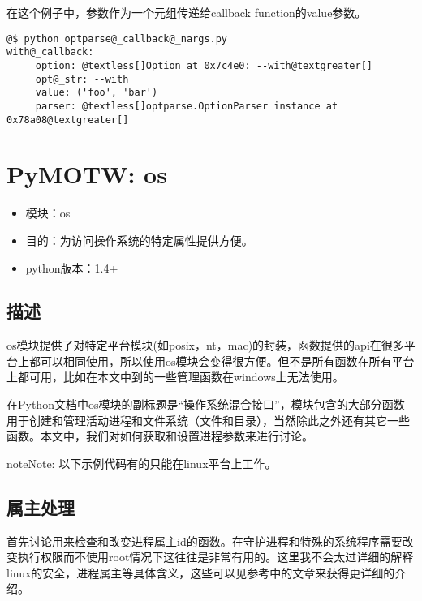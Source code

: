 \documentclass[letterpaper,10pt,english]{manual}
\begin{document}
在这个例子中，参数作为一个元组传递给callback function的value参数。

\begin{Verbatim}[commandchars=@\[\]]
@$ python optparse@_callback@_nargs.py
with@_callback:
     option: @textless[]Option at 0x7c4e0: --with@textgreater[]
     opt@_str: --with
     value: ('foo', 'bar')
     parser: @textless[]optparse.OptionParser instance at 0x78a08@textgreater[]
\end{Verbatim}

\resetcurrentobjects


\section{PyMOTW: os}
\begin{itemize}
\item {} 
模块：os

\item {} 
目的：为访问操作系统的特定属性提供方便。

\item {} 
python版本：1.4+

\end{itemize}


\subsection{描述}

os模块提供了对特定平台模块(如posix，nt，mac)的封装，函数提供的api在很多平台上都可以相同使用，所以使用os模块会变得很方便。但不是所有函数在所有平台上都可用，比如在本文中到的一些管理函数在windows上无法使用。

在Python文档中os模块的副标题是“操作系统混合接口”，模块包含的大部分函数用于创建和管理活动进程和文件系统（文件和目录），当然除此之外还有其它一些函数。本文中，我们对如何获取和设置进程参数来进行讨论。

\begin{notice}{note}{Note:}
以下示例代码有的只能在linux平台上工作。
\end{notice}


\subsection{属主处理}

首先讨论用来检查和改变进程属主id的函数。在守护进程和特殊的系统程序需要改变执行权限而不使用root情况下这往往是非常有用的。这里我不会太过详细的解释linux的安全，进程属主等具体含义，这些可以见参考中的文章来获得更详细的介绍。
\end{document}
